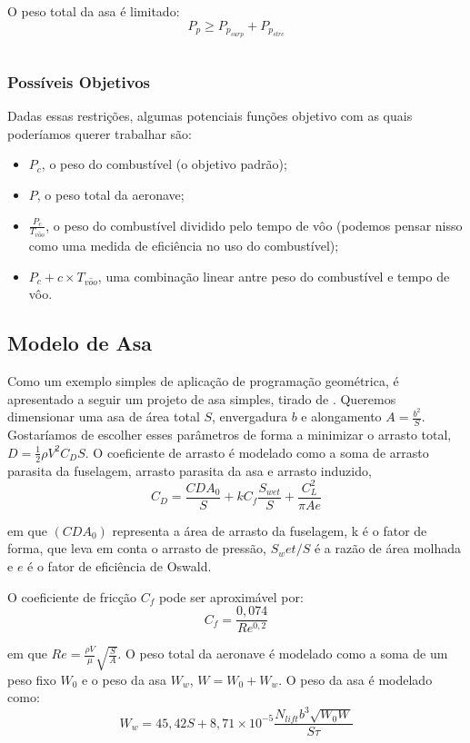 O peso total da asa é limitado:
\[
P_p \geq P_{p_{surp}} + P_{p_{strc}}
\]

\inputminted{python}{../Exemplos/Cap15/prog4_wwb.py}

\subsubsection{Possíveis Objetivos}

Dadas essas restrições, algumas potenciais funções objetivo com as
quais poderíamos querer trabalhar são:

\begin{itemize}
\item $P_c$, o peso do combustível (o objetivo padrão);
\item $P$, o peso total da aeronave;
\item $\frac{P_c}{T_{v\hat{o}o}}$, o peso do combustível dividido pelo
  tempo de vôo (podemos pensar nisso como uma medida de eficiência no
  uso do combustível);
\item $P_c + c \times T_{v\hat{o}o}$, uma combinação linear antre peso
  do combustível e tempo de vôo.
\end{itemize}




\subsection{Modelo de Asa}
Como um exemplo simples de aplicação de programação geométrica, é
apresentado a seguir um projeto de asa simples, tirado de
\cite{warren}.  Queremos dimensionar uma asa de área total $S$,
envergadura $b$ e alongamento $A = \frac{b^2}{S}$. Gostaríamos de
escolher esses parâmetros de forma a minimizar o arrasto total, $D =
\frac{1}{2}\rho V^2 C_D S$.  O coeficiente de arrasto é modelado como
a soma de arrasto parasita da fuselagem, arrasto parasita da asa e
arrasto induzido,
\[
C_D = \frac{CDA_0}{S} + kC_f \frac{S_{wet}}{S} + \frac{C_{L}^2}{\pi A
  e}
\]

\noindent em que $(CDA_0)$ representa a área de arrasto da fuselagem,
k é o fator de forma, que leva em conta o arrasto de pressão,
$S_wet/S$ é a razão de área molhada e $e$ é o fator de eficiência de
Oswald.

O coeficiente de fricção $C_f$ pode ser aproximável por:
\[
C_f = \frac{0,074}{Re^{0,2}}
\]

\noindent em que $Re = \frac{\rho V}{\mu} \sqrt{\frac{S}{A}}$. O peso
total da aeronave é modelado como a soma de um peso fixo $W_0$ e o
peso da asa $W_w$, $W = W_0 + W_w$. O peso da asa é modelado como:
\[
W_w = 45,42S + 8,71\times10^{-5} \frac{N_{lift}b^3\sqrt{W_0W}}{S\tau}
\]

